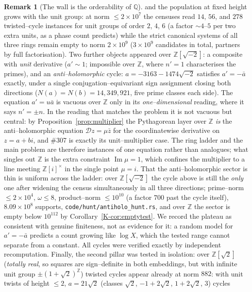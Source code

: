 \documentclass[11pt]{article}
\theoremstyle{definition}
\newtheorem{remark}[theorem]{Remark}
\begin{document}
\begin{remark}[The wall is the orderability of $\mathbb{Q}$]
and the population at fixed height grows with the unit group: at norm $\le2\times10^7$ the censuses
read $14$, $56$, and $278$ twisted--cycle instances for unit groups of order $2$, $4$, $6$ (a factor
${\sim}4$--$5$ per two extra units, as a phase count predicts) while the strict canonical systems of
all three rings remain empty to norm $2\times10^9$ ($3\times10^9$ candidates in total, partners by full
factorisation). Two further objects appeared over $\mathbb{Z}[\sqrt{-2}]$: a composite with \emph{unit}
derivative ($a'\sim1$; impossible over $\mathbb{Z}$, where $n'=1$ characterises the primes), and an
\emph{anti--holomorphic} cycle: $a=-3163-1474\sqrt{-2}$ satisfies $a'=-\bar a$ exactly, under a single
conjugation--equivariant sign assignment closing both directions ($N(a)=N(b)=14{,}349{,}921$, five prime
classes each side). The equation $a'=u\bar a$ is vacuous over $\mathbb{Z}$ only in its
\emph{one--dimensional} reading, where it says $n'=\pm n$. In the reading that matches the problem it is
not vacuous but central: by Proposition~\ref{prop:multiplier} the Pythagorean layer over $\mathbb{Z}$
\emph{is} the anti--holomorphic equation $\mathcal{D}z=\mu\bar z$ for the coordinatewise derivative on
$z=a+bi$, and \#307 is exactly its unit--multiplier case. The ring ladder and the main problem are
therefore instances of one equation rather than analogues; what singles out $\mathbb{Z}$ is the extra
constraint $\operatorname{Im}\mu=1$, which confines the multiplier to a line meeting
$\mathbb{Z}[i]^{\times}$ in the single point $\mu=i$. That the anti--holomorphic sector is thin is
uniform across the ladder: over $\mathbb{Z}[\sqrt{-2}]$ the cycle above is still the \emph{only} one
after widening the census simultaneously in all three directions; prime--norm $\le2\times10^4$,
$\omega\le8$, product--norm $\le10^{10}$ (a factor $700$ past the cycle itself), $8.09\times10^8$
supports, \texttt{code/hunt/antiholo\_hunt.rs}, and over
$\mathbb{Z}$ the sector is empty below $10^{112}$ by Corollary~\ref{K-cor:emptytest}. We record the
plateau as consistent with genuine finiteness, not as evidence for it: a random model for
$a'=-\bar a$ predicts a count growing like $\log X$, which the tested range cannot separate from a
constant. All cycles were verified exactly by independent recomputation. Finally, the second pillar was tested in isolation: over
$\mathbb{Z}[\sqrt2]$ (\emph{totally real}, so squares are sign--definite in both embeddings, but with
infinite unit group $\pm(1+\sqrt2)^{\mathbb{Z}}$) twisted cycles appear already at norm $882$: with
unit twists of height $\le2$, $a=21\sqrt2$ (classes $\sqrt2$, $-1+2\sqrt2$, $1+2\sqrt2$, $3$) cycles

\end{remark}
\end{document}
